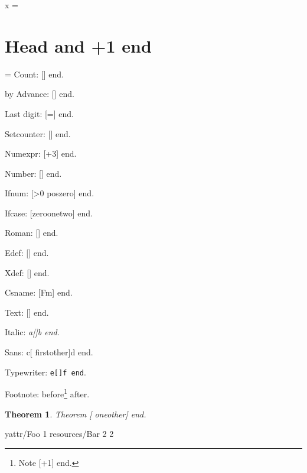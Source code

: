 \documentclass{article}
\newtheorem{theorem}{Theorem}
\newcounter{fm}
\begin{document}
\tableofcontents

\hbox{x} \formno=\pdflastxform
\xdef\savedform{\the\pdflastxform}

\section{Head \pdfxformname\pdflastxform{} and \number\numexpr\pdfxformname\pdflastxform+1\relax{} end}

\makeatletter
\count@=\pdfxformname\pdflastxform\relax
Count: [\the\count@] end.

\advance\count@ by \pdfxformname{}\relax
Advance: [\the\count@] end.

Last digit: [\count@=\relax\the\count@] end.
\makeatother

\setcounter{fm}{\pdfxformname\pdflastxform}%
Setcounter: [\thefm] end.

Numexpr: [\the\numexpr\pdfxformname{}+3\relax] end.

Number: [\number\pdfxformname\pdflastxform] end.

Ifnum: [\ifnum\pdfxformname\pdflastxform>0 pos\else zero\fi] end.

Ifcase: [\ifcase\pdfxformname\pdflastxform\relax zero\or one\or two\fi] end.

Roman: [\romannumeral\pdfxformname\pdflastxform\relax] end.

\edef\formedef{\pdfxformname\pdflastxform}%
Edef: [\formedef] end.

{\xdef\formxdef{\pdfxformname\pdflastxform}}%
Xdef: [\formxdef] end.

Csname: [\csname Fm\pdfxformname\pdflastxform\endcsname] end.

Text: [\pdfxformname\pdflastxform] end.

Italic: \emph{a[\number\pdfxformname\pdflastxform]b end}.

Sans: \textsf{c[\ifnum\pdfxformname{} first\else other\fi]d end}.

Typewriter: \texttt{e[\pdfxformname\pdflastxform]f end}.

Footnote: before\footnote{Note [\the\numexpr\pdfxformname\pdflastxform+1\relax] end.} after.

\begin{theorem}
Theorem [\ifnum\pdfxformname{} one\else other\fi] end.
\end{theorem}

\hbox{y}\immediate\pdfxform attr{/Foo 1} resources{/Bar 2} 2
\end{document}
